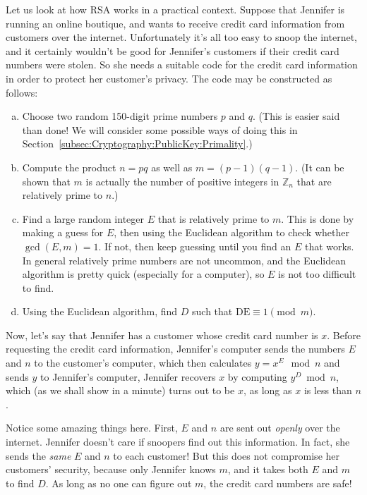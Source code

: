 Let us look at how RSA works in a practical context.  
Suppose that Jennifer is running an online boutique, and wants to receive
 credit card information from customers over the internet. Unfortunately it's all too easy to snoop the internet, 
and it certainly wouldn't be good for Jennifer's customers if their credit card numbers were stolen. 
So she needs a suitable code for the credit card information in order to protect her customer's privacy.
The code may be constructed as follows:
\begin{enumerate}[(a)]
\item 
Choose  two random 150-digit prime
numbers $p$ and $q$. (This is easier said than done!  We will consider some possible ways of doing this in Section~\ref{subsec:Cryptography:PublicKey:Primality}.)
\item
Compute the product $n= pq$ as well as $ m = (p - 1)(q-1)$. 
(It can be shown that $m$ is actually the number of positive integers in $\mathbb{Z}_n$ that are relatively prime to $n$.)    
\item
Find a large random integer $E$ that is relatively prime to $m$. This is done by making a guess for $E$, then using the Euclidean algorithm to check whether $\gcd(E, m) = 1$. If not, then keep guessing until you find an $E$ that works. In general relatively prime numbers are not uncommon, and the Euclidean algorithm is pretty quick (especially for a computer), so $E$ is not too difficult to find.  
\item
Using the Euclidean algorithm, find $D$ such that $\mbox{DE} \equiv 1 \pmod{m}$. 
\end{enumerate}
 Now, let's say that Jennifer has a  customer whose credit card number is $x$.  Before requesting the credit card information, Jennifer's computer  sends the numbers  $E$ and $n$ to the customer's computer, which then calculates $y = x^E \mod n$ and sends $y$ to
Jennifer's computer, Jennifer recovers $x$ by computing  $y^D \bmod
n$, which (as we shall show in a minute) turns out to be $x$, as long as $x$ is less than $n$. 

Notice some amazing things here. First, $E$ and $n$ are sent out \emph{openly} over the internet. Jennifer doesn't care if  snoopers find out this information. In fact, she sends the \emph{same} $E$ and $n$ to each customer! But this does not compromise her customers' security, because only Jennifer knows $m$, and it takes both $E$ and $m$ to find $D$. As long as no one can figure out $m$, the credit card numbers are safe!

